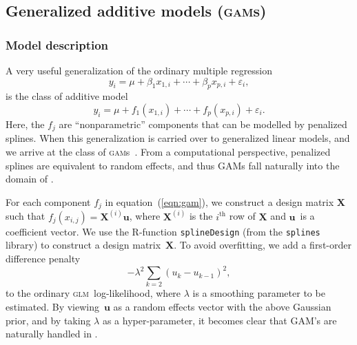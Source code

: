 \documentclass{admbmanual}
\newcommand{\scGAM}{\textsc{gam}}
\newcommand{\scGLM}{\textsc{glm}}
\begin{document}

\subsection{Generalized additive models (\scGAM{}s)}
\label{sec:gam}

\subsubsection{Model description}

A very useful generalization of the ordinary multiple regression
\[
y_{i}=\mu +\beta _{1}x_{1,i}+\cdots +\beta _{p}x_{p,i}+\varepsilon _{i},
\]%
is the class of additive model
\begin{equation}
y_{i}=\mu +f_{1}(x_{1,i})+\cdots +f_{p}(x_{p,i})+\varepsilon _{i}.
\label{eqn:gam}
\end{equation}%
Here, the $f_{j}$ are ``nonparametric'' components that can be modelled by
penalized splines. When this generalization is carried over to generalized
linear models, and we arrive at the class of \scGAM{}s~\cite{hast:tibs:1990}.
From a computational perspective, penalized splines are equivalent to random
effects, and thus GAMs fall naturally into the domain of \scAR.

For each component $f_{j}$ in equation~(\ref{eqn:gam}), we construct a design
matrix $\mathbf{X}$ such that $f_{j}(x_{i,j})=\mathbf{X}^{(i)}\mathbf{u}$, where
$\mathbf{X}^{(i)}$ is the $i^{\textrm{th}}$ row of $\mathbf{X}$ and
$\mathbf{u}$\ is a coefficient vector. We use the R-function
\texttt{splineDesign} (from the \texttt{splines} library) to construct a design
matrix~$\mathbf{X}$. To avoid overfitting, we add a first-order difference
penalty~\cite{eile:marx:1996}
\begin{equation}
-\lambda ^{2}\sum_{k=2}\left( u_{k}-u_{k-1}\right) ^{2},
\label{eqn:first_order}
\end{equation}
to the ordinary \scGLM\ log-likelihood, where $\lambda $ is a smoothing
parameter to be estimated. By viewing~$\mathbf{u}$ as a random effects vector
with the above Gaussian prior, and by taking $\lambda $ as a hyper-parameter, it
becomes clear that GAM's are naturally handled in \scAR.
\end{document}
